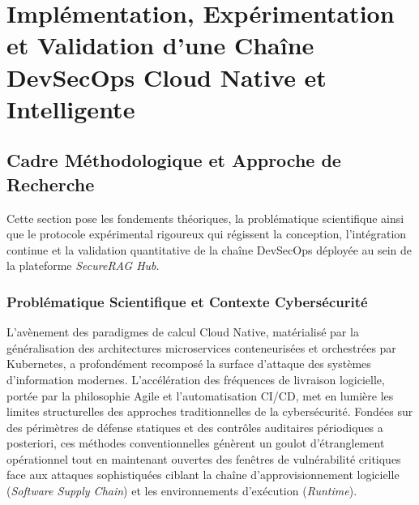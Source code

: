 \chapter{Implémentation, Expérimentation et Validation d'une Chaîne DevSecOps Cloud Native et Intelligente}
\label{ch:sprint_devsecops}

\section{Cadre Méthodologique et Approche de Recherche}
\label{sec:cadre_methodologique}

Cette section pose les fondements théoriques, la problématique scientifique ainsi que le protocole expérimental rigoureux qui régissent la conception, l'intégration continue et la validation quantitative de la chaîne DevSecOps déployée au sein de la plateforme \textit{SecureRAG Hub}.

\subsection{Problématique Scientifique et Contexte Cybersécurité}

L'avènement des paradigmes de calcul Cloud Native, matérialisé par la généralisation des architectures microservices conteneurisées et orchestrées par Kubernetes, a profondément recomposé la surface d'attaque des systèmes d'information modernes. L'accélération des fréquences de livraison logicielle, portée par la philosophie Agile et l'automatisation CI/CD, met en lumière les limites structurelles des approches traditionnelles de la cybersécurité. Fondées sur des périmètres de défense statiques et des contrôles auditaires périodiques a posteriori, ces méthodes conventionnelles génèrent un goulot d'étranglement opérationnel tout en maintenant ouvertes des fenêtres de vulnérabilité critiques face aux attaques sophistiquées ciblant la chaîne d'approvisionnement logicielle (\textit{Software Supply Chain}) et les environnements d'exécution (\textit{Runtime}).

